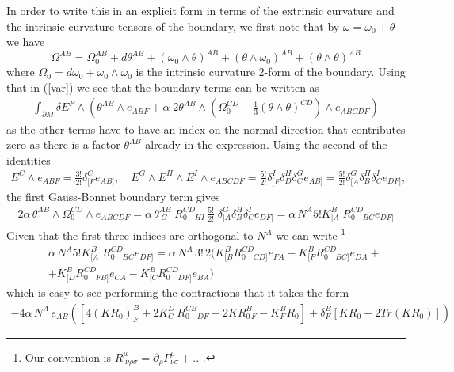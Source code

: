\documentclass[a4paper,a4paper]{article}
\begin{document}
In order to write this in an explicit form in terms of the extrinsic curvature and the intrinsic curvature
tensors of the boundary, we first note 
that by $\omega=\omega_0+\theta$ we have
\begin{equation}
\Omega^{AB}=\Omega_0^{AB}+d\theta^{AB}+(\omega_0 \wedge \theta)^{AB}+
(\theta \wedge \omega_0)^{AB} +(\theta \wedge \theta)^{AB}
\end{equation}
where $\Omega_0=d\omega_0+ \omega_0 \wedge \omega_0$ is the intrinsic curvature 2-form of the boundary.
Using that in (\ref{var}) we see that the boundary terms can be written as
\begin{eqnarray} \label{var2}
\int_{\partial M} \delta E^F \wedge (\theta^{AB} \wedge e_{ABF}+\alpha \; 2 \theta^{AB} \wedge 
( \Omega_0^{CD} + \frac{1}{3} (\theta \wedge \theta)^{CD}) \wedge e_{ABCDF}) 
\end{eqnarray} 
as the other terms have to have an index on the normal direction that contributes zero
as there is a factor $\theta^{AB}$ already in the expression.
Using the second of the identities
\begin{eqnarray}
E^C \wedge e_{ABF}= \frac{3!}{2!} \delta^C_{[F} e_{AB]}, \quad 
E^G \wedge E^H \wedge E^I \wedge e_{ABCDF}= \frac{5!}{2!} \delta^I_{[F} \delta^H_D \delta^G_C e_{AB]}=
\frac{5!}{2!} \delta^G_{[A} \delta^H_B \delta^I_C e_{DF]},
\end{eqnarray}
 the first Gauss-Bonnet boundary term gives
\begin{eqnarray}
2 \alpha \, \theta^{AB} \wedge \Omega_0^{CD} \wedge e_{ABCDF}= 
\alpha \, \theta^{AB}_{\; G} \; R^{CD}_{0 \quad HI} \,
\frac{5!}{2!} \; \delta^G_{[A} \delta^H_B \delta^I_C e_{DF]}=
\alpha \, N^A 5! K^B_{[A} \; R^{CD}_{0 \quad BC} e_{DF]}
\end{eqnarray}
Given that the first three indices are orthogonal to $N^A$ we can write
\footnote{Our convention is $R^{\mu}_{\; \nu\rho\sigma}= \partial_{\rho} \Gamma^{\mu}_{\nu\sigma}+..$ .}
\begin{eqnarray} 
&& \alpha \, N^A5! K^B_{[A} \; R^{CD}_{0 \quad BC} e_{DF]}=\alpha \, N^A \,
3!\,2 ( K^B_{[B}R^{CD}_{0 \quad CD]} e_{FA}-
K^B_{[F}R^{CD}_{0 \quad BC]} e_{DA} +  \\ && +K^B_{[D}R^{CD}_{0 \quad FB]} e_{CA}-
K^B_{[C}R^{CD}_{0 \quad DF]} e_{BA} ) \nonumber
\end{eqnarray}
which is easy to see performing the contractions that it takes the form
\begin{eqnarray}
-4\alpha \, N^A \, e_{AB} ([4 (KR_0)^B_F+2K^D_C \, R^{CB}_{0 \quad DF}-2K R^B_{0 \,F }- K^B_F R_0 ]+
\delta^B_F [K R_0 -2 Tr(K R_0)])
\end{eqnarray}
\end{document}
